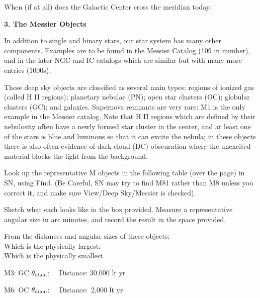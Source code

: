 \bigskip
\noindent
When (if at all) does the Galactic Center cross the meridian today:
\makebox[4cm]{\hrulefill}



\bigskip
\bigskip
\bigskip
\bigskip
\noindent
{\bf 3. The Messier Objects} 

\medskip
\noindent
In addition to single and binary stars, our star system has many other
components. Examples are to be found in the Messier Catalog (109
in number), and in the later NGC and IC catalogs which are similar but with
many more entries (1000s).

These deep sky objects are classified as several main types: regions of ionized
gas (called H II regions); planetary nebulae (PN); open star clusters
(OC); globular clusters (GC); and galaxies. Supernova remnants are
very rare: M1 is the only example in the Messier catalog.  Note that
H II regions which are defined by their nebulosity often have a newly
formed star cluster in the center, and at least one of the stars is
blue and luminous so that it can excite the nebula; in these objects
there is also often evidence of dark cloud (DC) obscuration where the
unexcited material blocks the light from the background.

\bigskip
\noindent
Look up the representative M objects in the following table (over the
page) in SN, using Find. (Be Careful, SN may try to find M81 rather
than M8 unless you correct it, and make sure View/Deep Sky/Messier
is checked).

\bigskip
\noindent
Sketch what each looks like in the box provided. Measure a
representative angular size in arc minutes, and record the result in
the space provided.

\bigskip
\noindent
From the distances and angular sizes of these objects: \\
Which is the physically largest: \makebox[3cm]{\hrulefill}\\
Which is the physically smallest.\makebox[3cm]{\hrulefill}

\newpage

\noindent
{\framebox[3.0cm]{\rule[-1.5cm]{0cm}{3cm}\,} \hspace{0.5cm}
M3: GC \hfill $\theta_{\rm diam}$: \makebox[3cm]{\hrulefill} \ \ Distance: 
30,000 lt yr}

\bigskip
\noindent
{\framebox[3.0cm]{\rule[-1.5cm]{0cm}{3cm}\,} \hspace{0.5cm}
M6: OC  \hfill $\theta_{\rm diam}$: \makebox[3cm]{\hrulefill} \ \ 
Distance:\ 2,000 lt yr}

